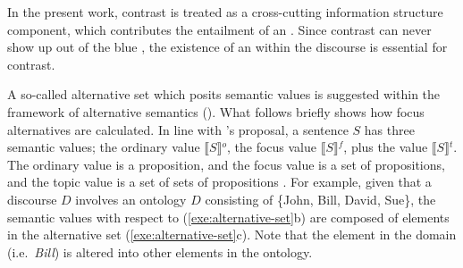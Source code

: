 In the present work, contrast is treated as a cross-cutting
information structure component, which contributes the entailment of
an  \citep{molnar:02,krifka:08}.  Since contrast
can never show up out of the blue \citep[9]{erteschik:07}, the
existence of an  within the discourse is essential for
contrast. 


A so-called alternative set which posits  semantic values is
suggested within the framework of alternative semantics
(\citealt{rooth:85,rooth:92}).  What follows briefly shows how focus
alternatives are calculated. In line with
\citeauthor{rooth:92}'s proposal, a sentence \ensuremath{S} has three
semantic values; the ordinary value \ensuremath{\llbracket S
  \rrbracket}$^{o}$, the focus value \ensuremath{\llbracket S
  \rrbracket}$^{f}$, plus the  value \ensuremath{\llbracket S
  \rrbracket}$^{t}$.  The ordinary value is a proposition, and the
focus value is a set of propositions, and the topic value is a set of
sets of propositions \citep[184]{nakanishi:07}.  For example,
given that a discourse \ensuremath{D} involves an ontology
\ensuremath{D} consisting of \{John, Bill, David, Sue\}, the semantic
values with respect to (\ref{exe:alternative-set}b) are composed of
elements in the alternative set (\ref{exe:alternative-set}c). Note
that the element in the  domain (i.e.\ \textit{Bill}) is altered
into other elements in the ontology.





